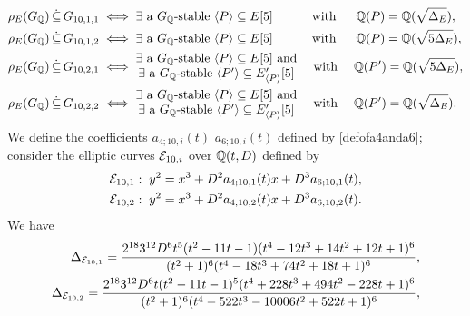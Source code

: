 \begin{equation} \label{conditionsforGsub10ij}
\begin{split}
\rho_{E}(G_{\mathbb{Q}}) \, \dot\subseteq \, G_{10,1,1} \; &\Longleftrightarrow \; \exists \text{ a $G_{\mathbb{Q}}$-stable } \langle P \rangle \subseteq E[5] \quad\quad\;\;\; \text{ with } \quad\; \mathbb{Q}(P) = \mathbb{Q}(\sqrt{\Delta_E}), \\
\rho_{E}(G_{\mathbb{Q}}) \, \dot\subseteq \, G_{10,1,2} \; &\Longleftrightarrow \; \exists \text{ a $G_{\mathbb{Q}}$-stable } \langle P \rangle \subseteq E[5] \quad\quad\;\;\; \text{ with } \quad\; \mathbb{Q}(P) = \mathbb{Q}(\sqrt{5\Delta_E}), \\
\rho_{E}(G_{\mathbb{Q}}) \, \dot\subseteq \, G_{10,2,1} \; &\Longleftrightarrow \; \begin{matrix} \exists \text{ a $G_{\mathbb{Q}}$-stable } \langle P \rangle \subseteq E[5] \text{ and} \\ \exists \text{ a $G_{\mathbb{Q}}$-stable } \langle P' \rangle \subseteq E_{\langle P \rangle}'[5] \end{matrix} \quad \text{ with } \quad \mathbb{Q}(P') = \mathbb{Q}( \sqrt{5\Delta_E}), \\
\rho_{E}(G_{\mathbb{Q}}) \, \dot\subseteq \, G_{10,2,2} \; &\Longleftrightarrow \; \begin{matrix} \exists \text{ a $G_{\mathbb{Q}}$-stable } \langle P \rangle \subseteq E[5] \text{ and} \\ \exists \text{ a $G_{\mathbb{Q}}$-stable } \langle P' \rangle \subseteq E_{\langle P \rangle}'[5] \end{matrix} \quad \text{ with } \quad \mathbb{Q}(P') = \mathbb{Q}( \sqrt{\Delta_E}).
\end{split}
\end{equation} 
We define the coefficients $a_{4;10,i}(t)$ $a_{6;10,i}(t)$ defined by \eqref{defofa4anda6}; consider the elliptic curves $\mathcal{E}_{10,i}$ over $\mathbb{Q}(t,D)$ defined by 
\[
\begin{split}
\mathcal{E}_{10,1} &: \; y^2 = x^3 + D^2a_{4;10,1}(t) x + D^3a_{6;10,1}(t), \\
\mathcal{E}_{10,2} &: \; y^2 = x^3 + D^2a_{4;10,2}(t) x + D^3a_{6;10,2}(t).
\end{split}
\]
We have
\[
\begin{split}
\Delta_{\mathcal{E}_{10,1}} = \frac{2^{18}3^{12}D^6 t^5 (t^2 - 11t - 1) (t^4 - 12t^3 + 14t^2 + 12t + 1)^6}{(t^2 + 1)^6 (t^4 - 18t^3 + 74t^2 + 18t + 1)^6}, \\
\Delta_{\mathcal{E}_{10,2}} = \frac{2^{18}3^{12}D^6 t (t^2 - 11t - 1)^5 (t^4 + 228t^3 + 494t^2 - 228t + 1)^6}{(t^2 + 1)^6 (t^4 - 522t^3 - 10006t^2 + 522t + 1)^6},
\end{split}
\]
